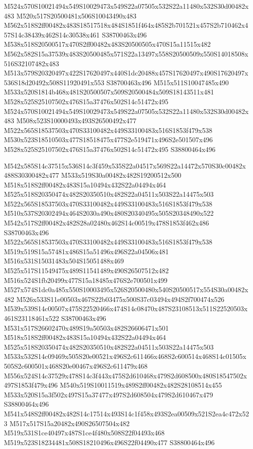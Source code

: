 \documentclass{article}
\begin{document}
\begin{multicols}{2}
M524x570S10021494x549S10029473x549S22a07505x532S22a11480x532S30d00482x483 M520x517S20500481x506S10043490x483 M562x518S2ff00482x483S18517518x484S1851f464x485S2b701521x457S2b710462x457S14c38439x462S14c30538x461 S38700463x496 M538x518S20500517x470S2ff00482x483S20500505x470S15a11515x482 M562x582S15a37539x483S20500485x571S22a13497x558S20500509x550S14018508x516S32107482x483 M513x579S20320497x422S17620497x440S1dc20488x457S17620497x490S17620497x536S18d20492x508S11920491x553 S38700463x496 M515x511S10047485x490 M533x520S1814b468x481S20500507x509S20500484x509S18143511x481 M528x525S25107502x476S15a37476x502S14c51472x495 M524x570S10021494x549S10029473x549S22a07505x532S22a11480x532S30d00482x483 M508x523S10000493x493S26500492x477 M522x565S18537503x470S33100482x449S33100483x516S1853f479x538 M530x523S18510503x477S18518475x477S2e519471x496S2e501507x496 M528x525S25107502x476S15a37476x502S14c51472x495 S38800464x496

M542x585S14c37515x536S14c3f459x535S22a04517x569S22a14472x570S30c00482x488S30300482x477 M533x519S30a00482x482S19200512x500 M518x518S2ff00482x483S15a10494x432S22a04494x464 M525x518S20350474x482S20350510x482S22a04511x503S22a14475x503 M522x565S18537503x470S33100482x449S33100483x516S1853f479x538 M510x537S20302494x464S2030a490x480S20340495x505S20348490x522 M542x517S2ff00482x482S28a02480x462S14c00519x478S1853f462x486 S38700463x496 M522x565S18537503x470S33100482x449S33100483x516S1853f479x538 M519x519S15a57481x486S15a51496x496S22a04506x481 M516x531S15031483x504S15051488x469 M525x517S11549475x489S11541489x490S26507512x482 M516x524S1fb20499x477S15a18485x476S2e700501x499 M527x574S1dc0a485x550S10003495x526S20500480x540S20500517x554S30a00482x482 M526x533S11e00503x467S22b03475x500S37c03494x494S2f700474x526 M539x539S14c00507x475S22520466x474S14c08470x487S23108513x511S22520503x461S23118461x522 S38700463x496 M531x517S26602470x489S19a50503x482S26606471x501 M518x518S2ff00482x483S15a10494x432S22a04494x464 M525x518S20350474x482S20350510x482S22a04511x503S22a14475x503 M533x532S14c09469x505S20e00521x496S2c611466x468S2c600514x468S14c01505x505S2c600501x468S20e00467x496S2c611479x468 M556x524S14c37529x478S14c3f443x475S2d610468x479S2d608500x480S18547502x497S1853f479x496 M540x519S10011519x489S2ff00482x482S28108514x455 M533x520S15a3f502x497S15a37477x497S2d608504x479S2d610467x479 S38800464x496 M541x548S2ff00482x482S14c17514x493S14c1f458x493S2ea00509x521S2ea4c472x523 M517x517S15a20482x490S26507504x482 M519x531S1ce40497x487S1ce4f480x508S22f04493x468 M519x523S18234481x508S18210496x496S22f04490x477 S38800464x496


\end{multicols}
\end{document}

